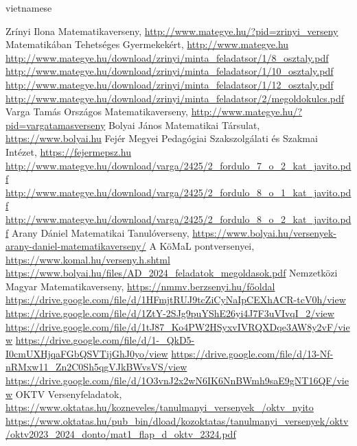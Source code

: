 \documentclass{article}
\begin{document}
\begin{otherlanguage*}{vietnamese}
\begin{thebibliography}{99}
     Zrínyi Ilona Matematikaverseny, \url{http://www.mategye.hu/?pid=zrinyi_verseny}
     Matematikában Tehetséges Gyermekekért, \url{http://www.mategye.hu}
     \url{http://www.mategye.hu/download/zrinyi/minta_feladatsor/1/8_osztaly.pdf}
     \url{http://www.mategye.hu/download/zrinyi/minta_feladatsor/1/10_osztaly.pdf}
     \url{http://www.mategye.hu/download/zrinyi/minta_feladatsor/1/12_osztaly.pdf}
     \url{http://www.mategye.hu/download/zrinyi/minta_feladatsor/2/megoldokulcs.pdf}
     Varga Tamás Országos Matematikaverseny, \url{http://www.mategye.hu/?pid=vargatamasverseny}
     Bolyai János Matematikai Társulat, \url{https://www.bolyai.hu}
     Fejér Megyei Pedagógiai Szakszolgálati és Szakmai Intézet, \url{https://fejermepsz.hu}
     \url{http://www.mategye.hu/download/varga/2425/2_fordulo_7_o_2_kat_javito.pdf}
     \url{http://www.mategye.hu/download/varga/2425/2_fordulo_8_o_1_kat_javito.pdf}
     \url{http://www.mategye.hu/download/varga/2425/2_fordulo_8_o_2_kat_javito.pdf}
     Arany Dániel Matematikai Tanulóverseny, \url{https://www.bolyai.hu/versenyek-arany-daniel-matematikaverseny/}
     A KöMaL pontversenyei, \url{https://www.komal.hu/verseny.h.shtml}
     \url{https://www.bolyai.hu/files/AD_2024_feladatok_megoldasok.pdf}
     Nemzetközi Magyar Matematikaverseny, \url{https://nmmv.berzsenyi.hu/főoldal}
     \url{https://drive.google.com/file/d/1HFmjtRUJ9tcZiCyNaIpCEXhACR-tcV0h/view}
     \url{https://drive.google.com/file/d/1ZtY-2SJg9puYShE26yi4J7F3uVIvqI_2/view}
     \url{https://drive.google.com/file/d/1tJ87_Ko4PW2HSyxvIVRQXDqe3AW8y2vF/view}
     \url{https://drive.google.com/file/d/1-_QkD5-I0cmUXHjqaFGbQSVTijGhJ0yo/view}
     \url{https://drive.google.com/file/d/13-Nf-nRMxw11_Zn2C0Sh5qgVJkBWvsVS/view}
     \url{https://drive.google.com/file/d/1O3vnJ2x2wN6IK6NnBWmh9saE9gNT16QF/view}
     OKTV Versenyfeladatok,\\ \url{https://www.oktatas.hu/kozneveles/tanulmanyi_versenyek_/oktv_nyito}
     \url{https://www.oktatas.hu/pub_bin/dload/kozoktatas/tanulmanyi_versenyek/oktv/oktv2023_2024_donto/mat1_flap_d_oktv_2324.pdf}

\end{thebibliography}
\end{otherlanguage*}
\end{document}
